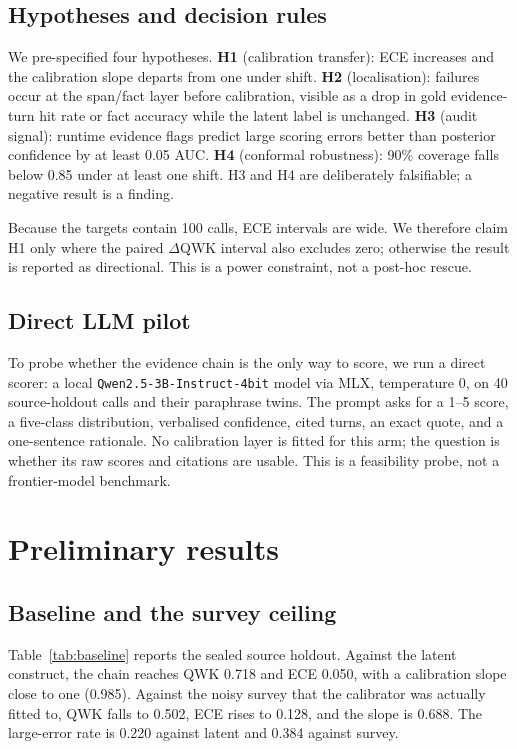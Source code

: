 \documentclass[11pt,a4paper]{article}
\begin{document}
\subsection{Hypotheses and decision rules}

We pre-specified four hypotheses. \textbf{H1} (calibration transfer): ECE increases and the
calibration slope departs from one under shift. \textbf{H2} (localisation): failures occur at the
span/fact layer before calibration, visible as a drop in gold evidence-turn hit rate or fact
accuracy while the latent label is unchanged. \textbf{H3} (audit signal): runtime evidence flags
predict large scoring errors better than posterior confidence by at least 0.05 AUC. \textbf{H4}
(conformal robustness): 90\% coverage falls below 0.85 under at least one shift. H3 and H4 are
deliberately falsifiable; a negative result is a finding.

Because the targets contain 100 calls, ECE intervals are wide. We therefore claim H1 only where
the paired $\Delta$QWK interval also excludes zero; otherwise the result is reported as
directional. This is a power constraint, not a post-hoc rescue.

\subsection{Direct LLM pilot}

To probe whether the evidence chain is the only way to score, we run a direct scorer: a local
\texttt{Qwen2.5-3B-Instruct-4bit} model \citep{qwen2024qwen25} via MLX, temperature 0, on 40
source-holdout calls and their paraphrase twins. The prompt asks for a 1--5 score, a five-class
distribution, verbalised confidence, cited turns, an exact quote, and a one-sentence rationale.
No calibration layer is fitted for this arm; the question is whether its raw scores and citations
are usable. This is a feasibility probe, not a frontier-model benchmark.

\section{Preliminary results}
\label{sec:results}

\subsection{Baseline and the survey ceiling}

Table~\ref{tab:baseline} reports the sealed source holdout. Against the latent construct, the
chain reaches QWK 0.718 and ECE 0.050, with a calibration slope close to one (0.985). Against
the noisy survey that the calibrator was actually fitted to, QWK falls to 0.502, ECE rises to
0.128, and the slope is 0.688. The large-error rate is 0.220 against latent and 0.384 against
survey.
\end{document}
